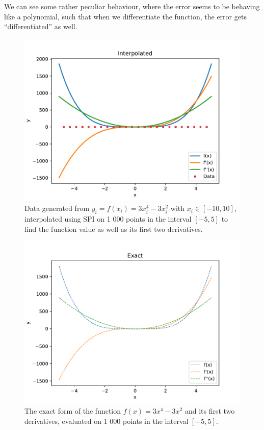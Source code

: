 \documentclass[11pt]{article}
\begin{document}
\begin{enumerate}
    We can see some rather peculiar behaviour, where the error seems to be behaving like a polynomial, such that when we differentiate the function, the error gets ``differentiated'' as well. \\

    \begin{figure}[H]
        \begin{center}
            \includegraphics[width=.6\textwidth]{Plots/q2afunc.pdf}
            \caption{Data generated from $y_i=f(x_i)=3x_i^4-3x_i^2$ with $x_i\in[-10,10]$, interpolated using SPI on 1 000 points in the interval $[-5,5]$ to find the function value as well as its first two derivatives.}
            \label{fig:q2afunc}
        \end{center}
    \end{figure}
    
    \begin{figure}[H]
        \begin{center}
            \includegraphics[width=.6\textwidth]{Plots/q2aexact.pdf}
            \caption{The exact form of the function $f(x)=3x^4-3x^2$ and its first two derivatives, evaluated on 1 000 points in the interval $[-5,5]$.}
            \label{fig:q2aexact}
        \end{center}
    \end{figure}
    

\end{enumerate}
\end{document}
